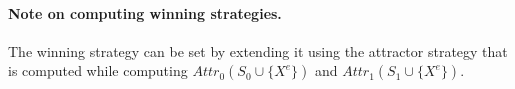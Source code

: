 \documentclass{article}
\newcommand{\If}{\text{\textbf{if }}}
\newcommand{\Then}{\text{\textbf{ then }}}
\begin{document}



\paragraph{Note on computing winning strategies.} The winning strategy can be set by extending
it using the attractor strategy that is computed while
computing $Attr_0(S_0 \cup \{X^e\})$ and $Attr_1(S_1 \cup \{X^e\})$.
\end{document}
